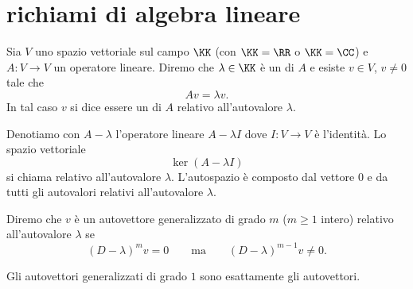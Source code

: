 \chapter{richiami di algebra lineare}

\begin{definition}
Sia $V$ uno spazio vettoriale sul campo $\KK$ (con $\KK = \RR$ o $\KK=\CC$)
e $A\colon V\to V$ un operatore lineare.
Diremo che $\lambda\in \KK$ è un  di $A$
e esiste $v\in V$, $v\neq 0$ tale che
\[
  Av = \lambda v.
\]
In tal caso $v$ si dice essere un  di $A$ relativo
all'autovalore $\lambda$.

Denotiamo con $A-\lambda$ l'operatore lineare $A-\lambda I$
dove $I\colon V\to V$ è l'identità.
Lo spazio vettoriale
\[
  \ker (A-\lambda I)
\]
si chiama  relativo all'autovalore $\lambda$.
L'autospazio è composto dal vettore $0$ e da tutti gli autovalori
relativi all'autovalore $\lambda$.

Diremo che $v$ è un autovettore generalizzato di grado $m$ ($m\ge 1$ intero)
relativo all'autovalore $\lambda$
se
\[
 (D-\lambda)^m v = 0
 \qquad \text{ma} \qquad
  (D-\lambda)^{m-1} v \neq 0.
\]

Gli autovettori generalizzati di grado $1$ sono esattamente gli
autovettori.
\end{definition}

